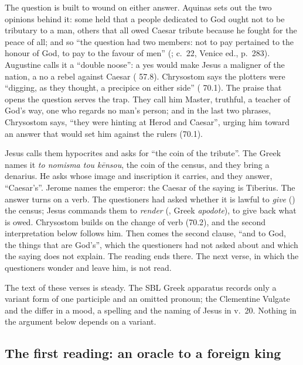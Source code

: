 The question is built to wound on either answer. Aquinas sets out the two
opinions behind it: some held that a people dedicated to God ought not to be
tributary to a man, others that all owed Caesar tribute because he fought for
the peace of all; and so ``the question had two members: not to pay pertained
to the honour of God, to pay to the favour of men'' (;  c.~22, Venice ed.,
p.~283). Augustine calls it a ``double noose'': a yes would make Jesus a
maligner of the nation, a no a rebel against Caesar ( 57.8). Chrysostom says the plotters were ``digging, as they thought, a
precipice on either side'' ( 70.1). The praise that
opens the question serves the trap. They call him Master, truthful, a teacher
of God's way, one who regards no man's person; and in the last two phrases,
Chrysostom says, ``they were hinting at Herod and Caesar'', urging him toward
an answer that would set him against the rulers (70.1).

Jesus calls them hypocrites and asks for ``the coin of the tribute''. The
Greek names it \textit{to nomisma tou k\=ensou}, the coin of the census, and
they bring a denarius. He asks whose image and inscription it carries, and they
answer, ``Caesar's''. Jerome names the emperor: the Caesar of the saying is
Tiberius. The answer turns on a verb. The questioners had asked whether it is
lawful to \emph{give} () the census; Jesus commands them to
\emph{render} (, Greek \textit{apodote}), to give back what is
owed. Chrysostom builds on the change of verb (70.2), and the second
interpretation below follows him. Then comes the
second clause, ``and to God, the things that are God's'', which the questioners
had not asked about and which the saying does not explain. The reading ends
there. The next verse, in which the questioners wonder and leave him, is not
read.

The text of these verses is steady. The SBL Greek apparatus records only a
variant form of one participle and an omitted pronoun; the Clementine Vulgate
and the  differ in a mood, a spelling and the naming of
Jesus in v.~20. Nothing in the
argument below depends on a variant.

\subsection{The first reading: an oracle to a foreign king}

